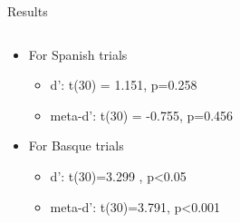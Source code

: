 \documentclass[final,12pt]{beamer}
\begin{document}
\begin{frame}[t]
\begin{columns}[t]
\begin{column}{\halfpagecol}
\begin{block}{Results}
\begin{columns}

    \begin{column}{0.40\linewidth}
          \vspace{-2em}
    \begin{greybox}{}
    \begin{itemize}
        \item For Spanish trials
          \begin{itemize}
            \item {\small d': t(30) = 1.151, p=0.258}
              \item {\small meta-d': t(30) = -0.755, p=0.456}
              \end{itemize}
              \end{itemize}
             \end{greybox}
        \begin{greybox}{}
        \begin{itemize}
            \item For Basque trials
            \begin{itemize}
                \item {\small d': t(30)=3.299 , p\textless0.05}
            \item {\small meta-d': t(30)=3.791, p\textless0.001}
            \end{itemize}
            \end{itemize}
            \end{greybox}
        
    \end{column}


\end{columns}
\end{block}
\end{column}
\end{columns}
\end{frame}
\end{document}

